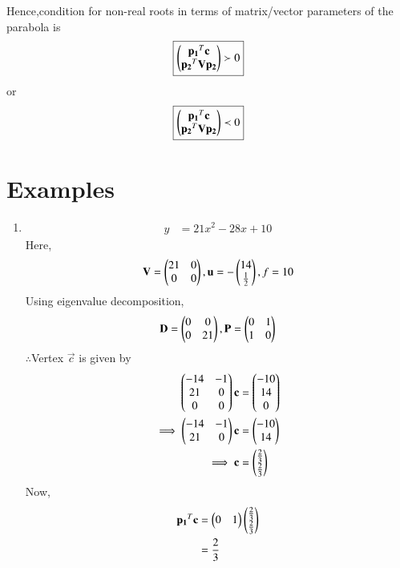 \documentclass[journal,12pt,twocolumn]{IEEEtran}
\begin{document}
Hence,condition for non-real roots in terms of matrix/vector parameters of the parabola is 
\begin{align}
    \boxed{\begin{pmatrix}\mathbf{p_1}^T\mathbf{c} \\ \mathbf{p_2}^T\mathbf{V}\mathbf{p_2} \end{pmatrix} \succ 0}
\end{align}
or
\begin{align}
    \boxed{\begin{pmatrix}\mathbf{p_1}^T\mathbf{c} \\ \mathbf{p_2}^T\mathbf{V}\mathbf{p_2} \end{pmatrix} \prec 0}
\end{align}

\newpage
\section{Examples}
\begin{enumerate}
    \item 
    \begin{align}
        y &= 21x^2-28x+10
    \end{align}
    Here,
    \begin{align}
        \mathbf{V} = \begin{pmatrix}21 & 0 \\ 0 & 0\end{pmatrix},\mathbf{u}=-\begin{pmatrix}14 \\ \frac{1}{2}\end{pmatrix},f=10
    \end{align}
    Using eigenvalue decomposition,
    \begin{align}
        \mathbf{D} = \begin{pmatrix}0 & 0\\0 & 21\end{pmatrix} ,\mathbf{P}=\begin{pmatrix}0 & 1\\1 & 0\end{pmatrix}
    \end{align}
    $\therefore$Vertex $\vec{c}$ is given by
    \begin{align}
        \begin{pmatrix}-14 & -1 \\ 21 & 0 \\ 0 & 0\end{pmatrix}\mathbf{c} &= \begin{pmatrix}-10 \\ 14 \\ 0\end{pmatrix} \\
        \implies  \begin{pmatrix}-14 & -1 \\ 21 & 0\end{pmatrix}\mathbf{c} &= \begin{pmatrix}-10 \\ 14\end{pmatrix}
        \\
        \implies \mathbf{c} &= \begin{pmatrix}\frac{2}{3} \\ \frac{2}{3}\end{pmatrix}
    \end{align}
    Now,
    \begin{align}
        \vec{p_1}^T\vec{c} &= \myvec{0 & 1}\myvec{\frac{2}{3} \\ \frac{2}{3}}
        \\
        &= \frac{2}{3}

\end{align}
\end{enumerate}
\end{document}
